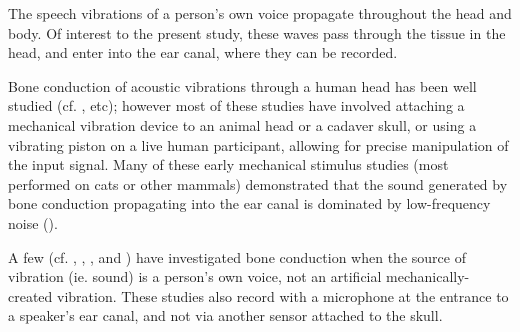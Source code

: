 
The speech vibrations of a person's own voice propagate throughout the head and body. %
Of interest to the present study, these waves pass through the tissue in the head, and enter into the ear canal, where they can be recorded. %

Bone conduction of acoustic vibrations through a human head has been well studied (cf. \cite{allen:60,tonndorf:66,hakansson:94,stenfelt:00,reinfeldt:10}, etc); however most of these studies have involved attaching a mechanical vibration device to an animal head or a cadaver skull, or using a vibrating piston on a live human participant, allowing for precise manipulation of the input signal.  
Many of these early mechanical stimulus studies (most performed on cats or other mammals) demonstrated that the sound generated by bone conduction propagating into the ear canal is dominated by low-frequency noise (\cite{tonndorf:72}).

% 
%
A few (cf. \cite{bekesy:48}, \cite{hansen:97b}, \cite{porschmann:00}, and \cite{reinfeldt:10}) have investigated bone conduction when the source of vibration (ie. sound) is a person's own voice, not an artificial mechanically-created vibration.  These studies also record with a microphone at the entrance to a speaker's ear canal, and not via another sensor attached to the skull.

